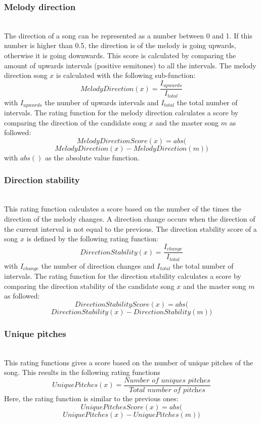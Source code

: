 \subsubsection{Melody direction}\mbox{}\\
The direction of a song can be represented as a number between 0 and 1. If this number is higher than 0.5, the direction is of the melody is going upwards, otherwise it is going downwards. This score is calculated by comparing the amount of upwards intervals (positive semitones) to all the intervals. The melody direction song $x$ is calculated with the following sub-function:
\[ MelodyDirection(x) = \frac{I_{upwards}}{I_{total}} \]
with $I_{upwards}$ the number of upwards intervals and $I_{total}$ the total number of intervals.
The rating function for the melody direction calculates a score by comparing the direction of the candidate song $x$ and the master song $m$ as followed:
\[ MelodyDirectionScore(x) = abs(\]
\[MelodyDirection(x) - MelodyDirection(m)) \]
with $abs()$ as the absolute value function.


\subsubsection{Direction stability}\mbox{}\\
This rating function calculates a score based on the number of the times the direction of the melody changes. A direction change occurs when the direction of the current interval is not equal to the previous. The direction stability score of a song $x$ is defined by the following rating function:
\[ DirectionStability(x) = \frac{I_{change}}{I_{total}} \]
with $I_{change}$ the number of direction changes and $I_{total}$ the total number of intervals.
The rating function for the direction stability calculates a score by comparing the direction stability of the candidate song $x$ and the master song $m$ as followed:
\[ DirectionStabilityScore(x) = abs(\]
\[DirectionStability(x) - DirectionStability(m)) \]

\subsubsection{Unique pitches}\mbox{}\\
This rating functions gives a score based on the number of unique pitches of the song. This results in the following rating functions
\[ UniquePitches(x) = \frac{\textit{Number of uniques pitches}}{\textit{Total number of pitches} } \]
Here, the rating function is similar to the previous ones:
\[ UniquePitchesScore(x) = abs(\]
\[UniquePitches(x) - UniquePitches(m)) \]

